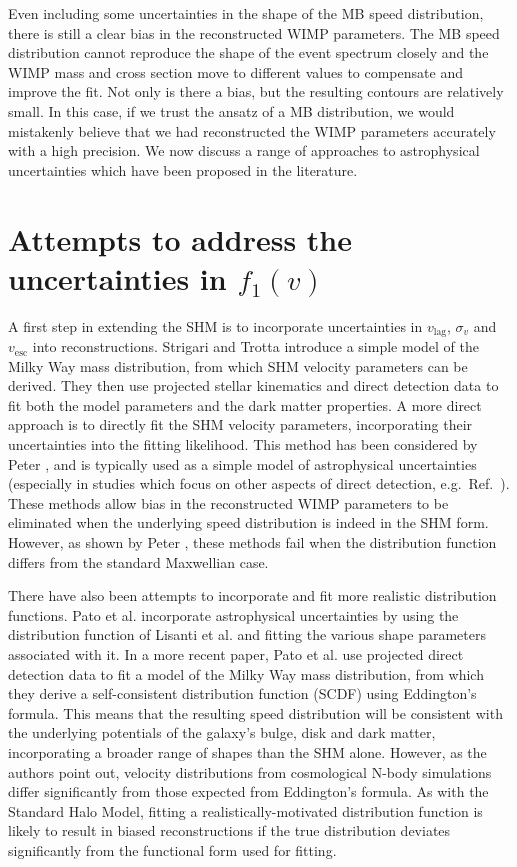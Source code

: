 Even including some uncertainties in the shape of the MB speed distribution, there is still a clear bias in the reconstructed WIMP parameters. The MB speed distribution cannot reproduce the shape of the event spectrum closely and the WIMP mass and cross section move to different values to compensate and improve the fit. Not only is there a bias, but the resulting contours are relatively small. In this case, if we trust the ansatz of a MB distribution, we would mistakenly believe that we had reconstructed the WIMP parameters accurately with a high precision. We now discuss a range of approaches to astrophysical uncertainties which have been proposed in the literature.


\section{Attempts to address the uncertainties in $f_1(v)$}
\label{sec:Speed:bias}

A first step in extending the SHM is to incorporate uncertainties in $v_\textrm{lag}$, $\sigma_v$ and $v_\textrm{esc}$ into reconstructions. Strigari and Trotta \cite{Strigari:2009} introduce a simple model of the Milky Way mass distribution, from which SHM velocity parameters can be derived. They then use projected stellar kinematics and direct detection data to fit both the model parameters and the dark matter properties. A more direct approach is to directly fit the SHM velocity parameters, incorporating their uncertainties into the fitting likelihood. This method has been considered by Peter \cite{Peter:2010}, and is typically used as a simple model of astrophysical uncertainties (especially in studies which focus on other aspects of direct detection, e.g.\ Ref.~\cite{Arina:2013}). These methods allow bias in the reconstructed WIMP parameters to be eliminated when the underlying speed distribution is indeed in the SHM form. However, as shown by Peter \cite{Peter:2011}, these methods fail when the distribution function differs from the standard Maxwellian case.

There have also been attempts to incorporate and fit more realistic distribution functions. Pato et al. \cite{Pato:2011} incorporate astrophysical uncertainties by using the distribution function of Lisanti et al. \cite{Lisanti:2010} and fitting the various shape parameters associated with it. In a more recent paper, Pato et al. \cite{Pato:2013} use projected direct detection data to fit a model of the Milky Way mass distribution, from which they derive a self-consistent distribution function (SCDF) using Eddington's formula. This means that the resulting speed distribution will be consistent with the underlying potentials of the galaxy's bulge, disk and dark matter, incorporating a broader range of shapes than the SHM alone. However, as the authors point out, velocity distributions from cosmological N-body simulations differ significantly from those expected from Eddington's formula. As with the Standard Halo Model, fitting a realistically-motivated distribution function is likely to result in biased reconstructions if the true distribution deviates significantly from the functional form used for fitting.

